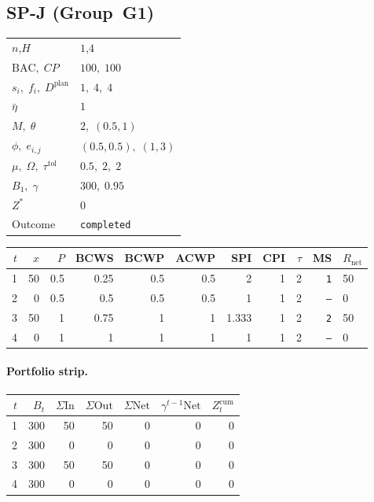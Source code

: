 \documentclass[12pt, a4paper]{article}
\newcommand{\BAC}{\mathrm{BAC}}
\begin{document}
\newpage

\subsection*{SP-J  (Group~G1)}
\begin{center}
\begin{tabular}{ll}
\toprule
$n$,\;$H$ & $1$,\;$4$ \\
$\BAC,\;CP$ & $100,\;100$ \\
$s_i,\;f_i,\;D^{\mathrm{plan}}$ & $1,\;4,\;4$ \\
$\bar\eta$ & $1$ \\
$M,\;\theta$ & $2,\;(0.5,1)$ \\
$\phi,\;e_{i,j}$ & $(0.5,0.5),\;(1,3)$ \\
$\mu,\;\Omega,\;\tau^{\mathrm{tol}}$ & $0.5,\;2,\;2$ \\
$B_1,\;\gamma$ & $300,\;0.95$ \\
$Z^*$ & $0$ \\
Outcome & \texttt{completed} \\
\bottomrule
\end{tabular}
\end{center}

\begin{center}
\begin{tabular}{rrrrrrrrrrl}
\toprule
$t$ & $x$ & $P$ & BCWS & BCWP & ACWP & SPI & CPI & $\tau$ & MS & $R_{\mathrm{net}}$\\
\midrule
1 & 50 & 0.5 & 0.25 & 0.5 & 0.5 & 2 & 1 & 2 & \texttt{1} & 50 \\
2 & 0 & 0.5 & 0.5 & 0.5 & 0.5 & 1 & 1 & 2 & \texttt{---} & 0 \\
3 & 50 & 1 & 0.75 & 1 & 1 & 1.333 & 1 & 2 & \texttt{2} & 50 \\
4 & 0 & 1 & 1 & 1 & 1 & 1 & 1 & 2 & \texttt{---} & 0 \\
\bottomrule
\end{tabular}
\end{center}
\paragraph{Portfolio strip.}
\begin{center}
\begin{tabular}{rrrrrrr}
\toprule
$t$ & $B_t$ & $\Sigma\mathrm{In}$ & $\Sigma\mathrm{Out}$ & $\Sigma\mathrm{Net}$ & $\gamma^{t-1}\mathrm{Net}$ & $Z_t^{\mathrm{cum}}$\\
\midrule
1 & 300 & 50 & 50 & 0 & 0 & 0 \\
2 & 300 & 0 & 0 & 0 & 0 & 0 \\
3 & 300 & 50 & 50 & 0 & 0 & 0 \\
4 & 300 & 0 & 0 & 0 & 0 & 0 \\
\bottomrule
\end{tabular}
\end{center}
\end{document}
